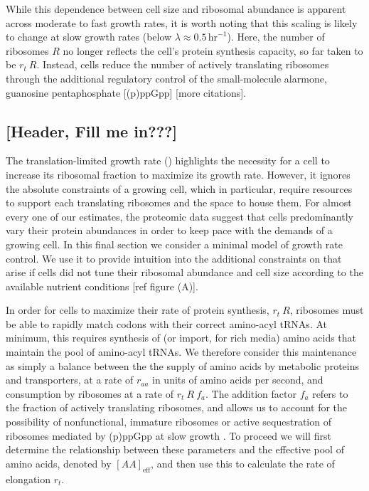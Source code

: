 \newpage

While this dependence between cell size and ribosomal abundance is apparent
across moderate to fast growth rates, it is worth noting that this scaling is
likely to change at slow growth rates (below $\lambda \approx
0.5\,\text{hr}^{-1}$). Here, the number of ribosomes $R$ no longer reflects the
cell's protein synthesis capacity, so far taken to be $r_t
\ R$. Instead, cells reduce the number of actively translating
ribosomes through the additional regulatory control of the small-molecule
alarmone, guanosine pentaphosphate [(p)ppGpp] \citep{dai2016} [more citations].


\subsection{[Header, Fill me in???]}

The translation-limited growth rate ()
highlights the necessity for a cell to increase its ribosomal fraction to
maximize its growth rate. However, it ignores the absolute constraints of a
growing cell, which in particular, require resources to support each translating
ribosomes and the space to house them. For almost every one of our estimates,
the proteomic data suggest that cells predominantly vary their protein
abundances in order to keep pace with the demands of a growing cell. In this
final section we consider a minimal model of growth rate control. We use it to
provide intuition into the additional constraints on that arise if cells did not
tune their ribosomal abundance and cell size according to the available nutrient
conditions [ref figure (A)].


In order for cells to maximize their rate of protein synthesis, $r_t \ R$,
ribosomes must be able to rapidly match codons with their correct amino-acyl
tRNAs. At minimum, this requires synthesis of (or import, for rich media) amino
acids that maintain the pool of amino-acyl tRNAs. We therefore consider this
maintenance as simply a balance between the the supply of amino acids by
metabolic proteins and transporters, at a rate of $r_{aa}$ in units of amino
acids per second, and consumption by ribosomes at a rate of $r_t \ R \ f_a$. The
addition factor $f_a$ refers to the fraction of actively translating ribosomes,
and allows us to account for the possibility of nonfunctional, immature
ribosomes or active sequestration of ribosomes mediated by (p)ppGpp at slow
growth \citep{dennis2004, dai2016}. To proceed we will first determine the
relationship between these parameters and the effective pool of amino acids,
denoted by $[AA]_{\text{eff}}$, and then use this to calculate the rate of
elongation $r_t$.

